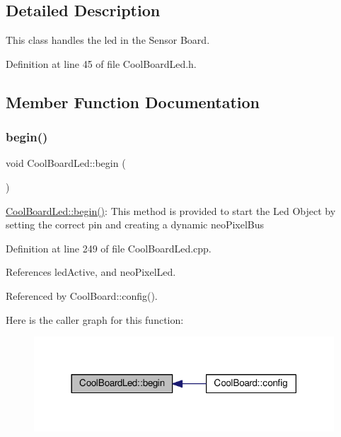 \subsection{Detailed Description}
This class handles the led in the Sensor Board. 

Definition at line 45 of file Cool\+Board\+Led.\+h.



\subsection{Member Function Documentation}
\mbox{\label{class_cool_board_led_ae3cbde8affcc6f011cbd698c8ef911f6}} 
\subsubsection{\texorpdfstring{begin()}{begin()}}
{\footnotesize\ttfamily void Cool\+Board\+Led\+::begin (\begin{DoxyParamCaption}{ }\end{DoxyParamCaption})}

\hyperlink{class_cool_board_led_ae3cbde8affcc6f011cbd698c8ef911f6}{Cool\+Board\+Led\+::begin()}\+: This method is provided to start the Led Object by setting the correct pin and creating a dynamic neo\+Pixel\+Bus 

Definition at line 249 of file Cool\+Board\+Led.\+cpp.



References led\+Active, and neo\+Pixel\+Led.



Referenced by Cool\+Board\+::config().

Here is the caller graph for this function\+:
\nopagebreak
\begin{figure}[H]
\begin{center}
\leavevmode
\includegraphics[width=318pt]{de/dc0/class_cool_board_led_ae3cbde8affcc6f011cbd698c8ef911f6_icgraph}
\end{center}
\end{figure}
\mbox{\label{class_cool_board_led_a30fadd4cbec17ceea428bf7a32207e87}} 
